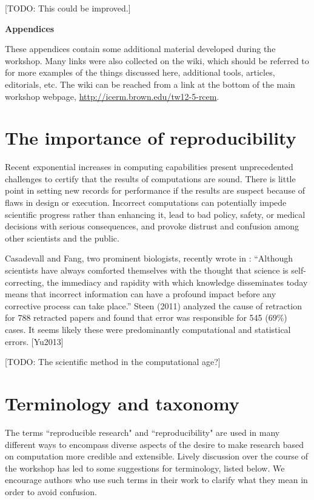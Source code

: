 \documentclass[11pt]{article}
\newcommand{\todo}[1]{{\color{red} [TODO: #1]}}
\newcommand{\todo}[1]{}
\begin{document}
\todo{This could be improved.}





\clearpage
\appendix
\centerline{\Large\bf Appendices}
\vskip 10pt

These appendices contain some additional material developed during the
workshop.  Many links were also collected on the wiki, which should be
referred to for more examples of the things discussed here, additional
tools, articles, editorials, etc.  The wiki can be reached from a link at
the bottom of the main workshop webpage, 
\url{http://icerm.brown.edu/tw12-5-rcem}.

\section{The importance of reproducibility} \label{sec:importance}

Recent exponential increases in computing
capabilities present unprecedented challenges to certify
that the results of computations are sound.  There is little point
in setting new records for performance if the results are suspect
because of flaws in design or execution.  Incorrect computations
can potentially impede scientific progress rather than enhancing
it, lead to bad policy, safety, or medical decisions with serious
consequences, and provoke distrust and confusion among other
scientists and the public.


Casadevall and Fang, two prominent biologists, recently wrote in \cite{??}: 
``Although
scientists have always comforted themselves with the thought that science is
self-correcting, the immediacy and rapidity with which knowledge
disseminates today means that incorrect information can have a profound
impact before any corrective process can take place.'' Steen (2011) analyzed
the cause of retraction for 788 retracted papers and found that error was
responsible for 545 (69\%) cases. It seems likely these were predominantly
computational and statistical errors. [Yu2013]


\todo{The scientific method in the computational age?}

\section{Terminology and taxonomy} \label{sec:taxonomy}

The terms ``reproducible research" and ``reproducibility" are used in many
different ways to encompass diverse aspects of the desire to make research
based on computation more credible and extensible.  Lively discussion over
the course of the workshop has led to some suggestions for terminology,
listed below.  We encourage authors who use such
terms in their work to clarify what they mean in order to avoid confusion. 
\end{document}
